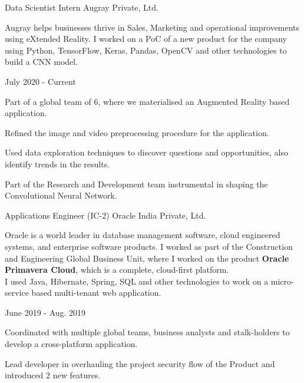 \begin{cventries}
  \cvexperience
    {Data Scientist Intern}
    {Augray Private, Ltd.}
    {}
    {
    \begin{cvitems}
    \hspace{-2ex}
        Augray helps businesses thrive in Sales, Marketing and operational improvements using eXtended Reality. I worked on a PoC of a new product for the company using Python, TensorFlow, Keras, Pandas, OpenCV and other technologies to build a CNN model.
    \end{cvitems}
    \vspace{-2ex}
    }
    {July 2020 - Current}
    {
      \begin{cvitems}
        \item {Part of a global team of 6, where we materialised an Augmented Reality based application.}
        \item {Refined the image and video preprocessing procedure for the application.}
        \item {Used data exploration techniques to discover questions and opportunities, also identify trends in the results.}
        \item {Part of the Research and Development team instrumental in shaping the Convolutional Neural Network.}
      \end{cvitems}
    }
  \cvexperience
    {Applications Engineer (IC-2)}
    {Oracle India Private, Ltd.}
    {}
    {
    \begin{cvitems}
    \hspace{-2ex}
        Oracle is a world leader in database management software, cloud engineered systems, and enterprise software products. I worked as part of the Construction and Engineering Global Business Unit, where I worked on the product \textbf{Oracle Primavera Cloud}, which is a complete, cloud-first platform.\\
        I used Java, Hibernate, Spring, SQL and other technologies to work on a micro-service based multi-tenant web application.
    \end{cvitems}
    \vspace{-2ex}
    }
    {June 2019 - Aug. 2019}
    {
      \begin{cvitems}
        \item {Coordinated with multiple global teams, business analysts and stalk-holders to develop a cross-platform application.}
        \item {Lead developer in overhauling the project security flow of the Product and introduced 2 new features.}

\end{cvitems}}
\end{cventries}
